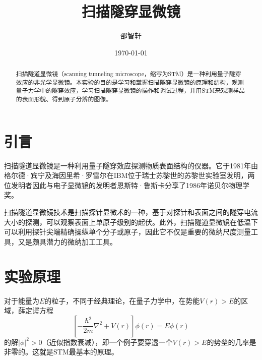 \documentclass[aps,pre,12pt,preprint,onecolumn,showpacs,showkeys]{revtex4-1}
\begin{document}
\title{\bf\heiti{}扫描隧穿显微镜\vspace{15mm}}
\author{\fangsong{}邵智轩\vspace{2mm}}
\date{\today}

\begin{abstract}
\vspace{10mm}
\begin{spacing}{1.5}
\songti{}
扫描隧道显微镜（scanning tunneling microscope，缩写为STM）是一种利用量子隧穿效应的非光学显微镜。本实验的目的是学习和掌握扫描隧穿显微镜的原理和结构，观测量子力学中的隧穿效应，学习扫描隧穿显微镜的操作和调试过程，并用STM来观测样品的表面形貌、得到原子分辨的图像。
\end{spacing}
\end{abstract}
\maketitle
\songti{}

\section{引言}
扫描隧道显微镜是一种利用量子隧穿效应探测物质表面结构的仪器。它于1981年由格尔德·宾宁及海因里希·罗雷尔在IBM位于瑞士苏黎世的苏黎世实验室发明，两位发明者因此与电子显微镜的发明者恩斯特·鲁斯卡分享了1986年诺贝尔物理学奖。

扫描隧道显微镜技术是扫描探针显微术的一种，基于对探针和表面之间的隧穿电流大小的探测，可以观察表面上单原子级别的起伏。此外，扫描隧道显微镜在低温下可以利用探针尖端精确操纵单个分子或原子，因此它不仅是重要的微纳尺度测量工具，又是颇具潜力的微纳加工工具。
 
\section{实验原理}
对于能量为$E$的粒子，不同于经典理论，在量子力学中，在势能$V(r)>E$的区域，薛定谔方程
\begin{equation}
\left[ -\frac{\hbar^2}{2m} \nabla^2 +V(r)\right] \phi(r)=E \phi(r)
\end{equation}
的解$|\phi|^2>0$（近似指数衰减），即一个例子要穿透一个$V(r)>E$的势垒的几率是非零的。这就是STM最基本的原理。
\end{document}
